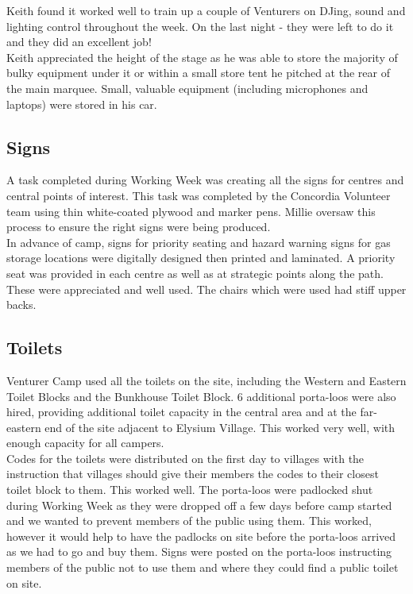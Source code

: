 Keith found it worked well to train up a couple of Venturers on DJing, sound and lighting control throughout the week. On the last night - they were left to do it and they did an excellent job!\\

Keith appreciated the height of the stage as he was able to store the majority of bulky equipment under it or within a small store tent he pitched at the rear of the main marquee. Small, valuable equipment (including microphones and laptops) were stored in his car. 

\subsection{Signs}
A task completed during Working Week was creating all the signs for centres and central points of interest. This task was completed by the Concordia Volunteer team using thin white-coated plywood and marker pens. Millie oversaw this process to ensure the right signs were being produced.\\

In advance of camp, signs for priority seating and hazard warning signs for gas storage locations were digitally designed then printed and laminated. A priority seat was provided in each centre as well as at strategic points along the path. These were appreciated and well used. The chairs which were used had stiff upper backs.
\subsection{Toilets}
Venturer Camp used all the toilets on the site, including the Western and Eastern Toilet Blocks and the Bunkhouse Toilet Block. 6 additional porta-loos were also hired, providing additional toilet capacity in the central area and at the far-eastern end of the site adjacent to Elysium Village. This worked very well, with enough capacity for all campers.\\

Codes for the toilets were distributed on the first day to villages with the instruction that villages should give their members the codes to their closest toilet block to them. This worked well. The porta-loos were padlocked shut during Working Week as they were dropped off a few days before camp started and we wanted to prevent members of the public using them. This worked, however it would help to have the padlocks on site before the porta-loos arrived as we had to go and buy them. Signs were posted on the porta-loos instructing members of the public not to use them and where they could find a public toilet on site.  \\

